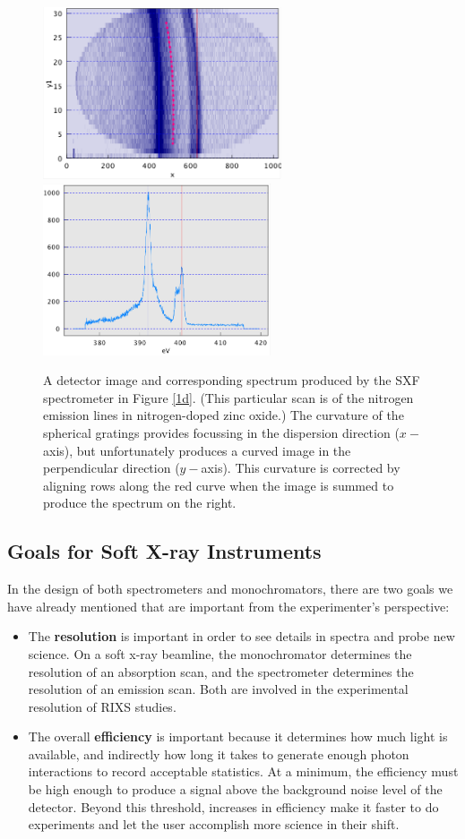 \begin{figure}[htbp] %
   \centering
   \includegraphics[height=2in]{../data/Chapter1/1e_spectrometerData/1e_image.png} \includegraphics[height=2in]{../data/Chapter1/1e_spectrometerData/1e_spectrum.png}
   \caption{A detector image and corresponding spectrum produced by the SXF spectrometer in Figure \ref{1d}.  (This particular scan is of the nitrogen emission lines in nitrogen-doped zinc oxide.)  The curvature of the spherical gratings provides focussing in the dispersion direction ($x-$axis), but unfortunately produces a curved image in the perpendicular direction ($y-$axis).  This curvature is corrected by aligning rows along the red curve when the image is summed to produce the spectrum on the right.}
   \label{1e}
\end{figure}

\subsection{Goals for Soft X-ray Instruments}
\label{resolutionGoals}
In the design of both spectrometers and monochromators, there are two goals we have already mentioned that are important from the experimenter's perspective:
\begin{itemize}
\item The \textbf{resolution} is important in order to see details in spectra and probe new science.  On a soft x-ray beamline, the monochromator determines the resolution of an absorption scan, and the spectrometer determines the resolution of an emission scan.  Both are involved in the experimental resolution of RIXS studies.
\item The overall \textbf{efficiency} is important because it determines how much light is available, and indirectly how long it takes to generate enough photon interactions to record acceptable statistics.  At a minimum, the efficiency must be high enough to produce a signal above the background noise level of the detector.  Beyond this threshold, increases in efficiency make it faster to do experiments and let the user accomplish more science in their shift.
\end{itemize}

